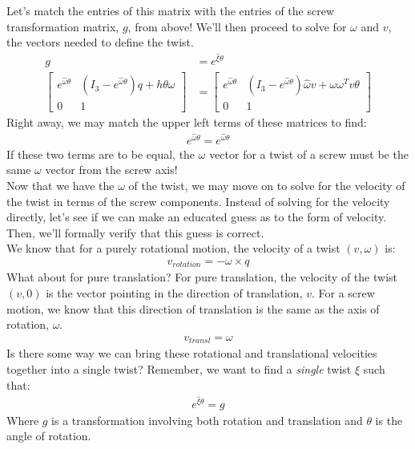 \documentclass[oneside]{book}
\begin{document}
Let's match the entries of this matrix with the entries of the screw transformation matrix, $g$, from above! We'll then proceed to solve for $\omega$ and $v$, the vectors needed to define the twist.
\begin{align}
    g &= e^{\hat\xi\theta}\\
    \begin{bmatrix}
    e^{\hat\omega\theta} & (I_3 -e^{\hat\omega\theta})q + h\theta\omega \\
    0 & 1
    \end{bmatrix} &= \begin{bmatrix}
    e^{\hat\omega\theta} & (I_3 - e^{\hat\omega\theta})\hat\omega v + \omega \omega ^T v\theta\\
    0 & 1
    \end{bmatrix}
\end{align}
Right away, we may match the upper left terms of these matrices to find:
\begin{align}
    e^{\hat\omega\theta} = e^{\hat\omega\theta}
\end{align}
If these two terms are to be equal, the $\omega$ vector for a twist of a screw must be the same $\omega$ vector from the screw axis!\\
Now that we have the $\omega$ of the twist, we may move on to solve for the velocity of the twist in terms of the screw components. Instead of solving for the velocity directly, let's see if we can make an educated guess as to the form of velocity. Then, we'll formally verify that this guess is correct.\\
We know that for a purely rotational motion, the velocity of a twist $(v, \omega)$ is:
\begin{align}
    v_{rotation} = -\omega \times q
\end{align}
What about for pure translation? For pure translation, the velocity of the twist $(v, 0)$ is the vector pointing in the direction of translation, $v$. For a screw motion, we know that this direction of translation is the same as the axis of rotation, $\omega$.
\begin{align}
    v_{transl} = \omega
\end{align}
Is there some way we can bring these rotational and translational velocities together into a single twist? Remember, we want to find a \textit{single} twist $\xi$ such that:
\begin{align}
    e^{\hat\xi\theta} = g
\end{align}
Where $g$ is a transformation involving both rotation and translation and $\theta$ is the angle of rotation.\\
\end{document}
